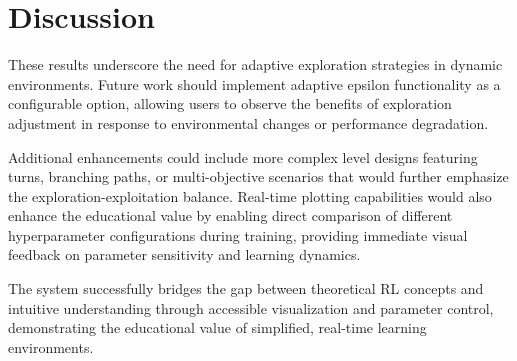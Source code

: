 \section{Discussion}

These results underscore the need for adaptive exploration strategies in dynamic environments. Future work should implement adaptive epsilon functionality as a configurable option, allowing users to observe the benefits of exploration adjustment in response to environmental changes or performance degradation.

Additional enhancements could include more complex level designs featuring turns, branching paths, or multi-objective scenarios that would further emphasize the exploration-exploitation balance. Real-time plotting capabilities would also enhance the educational value by enabling direct comparison of different hyperparameter configurations during training, providing immediate visual feedback on parameter sensitivity and learning dynamics.

The system successfully bridges the gap between theoretical RL concepts and intuitive understanding through accessible visualization and parameter control, demonstrating the educational value of simplified, real-time learning environments.